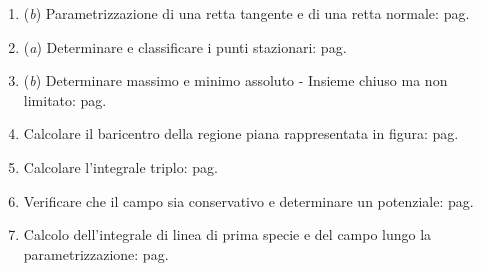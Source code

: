 \documentclass[a4paper]{article}
\begin{document}
\begin{itemize}
\begin{itemize}
\begin{itemize}
\begin{enumerate}[label*=Ex. \arabic*), leftmargin = 4em]
					\item (\emph{b}) Parametrizzazione di una retta tangente e di una retta normale: pag.~\hyperlink{
						exam: esame 06 settembre 2023 - Gruppo A - 4 esercizio (b)
					}{
					}

					\item (\emph{a}) Determinare e classificare i punti stazionari: pag.~\hyperlink{
						exam: esame 06 settembre 2023 - Gruppo A - 5 esercizio (a)
					}{
					}

					\setcounter{enumi}{4}

					\item (\emph{b}) Determinare massimo e minimo assoluto - Insieme chiuso ma non limitato: pag.~\hyperlink{
						exam: esame 06 settembre 2023 - Gruppo A - 5 esercizio (b)
					}{
					}

					\item Calcolare il baricentro della regione piana rappresentata in figura: pag.~\hyperlink{
						exam: esame 06 settembre 2023 - Gruppo A - 6 esercizio
					}{
					}

					\item Calcolare l'integrale triplo: pag.~\hyperlink{
						exam: esame 06 settembre 2023 - Gruppo A - 7 esercizio
					}{
					}

					\item Verificare che il campo sia conservativo e determinare un potenziale: pag.~\hyperlink{
						exam: esame 06 settembre 2023 - Gruppo A - 8 esercizio (a)
					}{
					}

					\item Calcolo dell'integrale di linea di prima specie e del campo lungo la parametrizzazione: pag.~\hyperlink{
						exam: esame 06 settembre 2023 - Gruppo A - 8 esercizio (b)
					}{
					}
				\end{enumerate}
			\end{itemize}
		\end{itemize}


\end{itemize}
\end{document}
